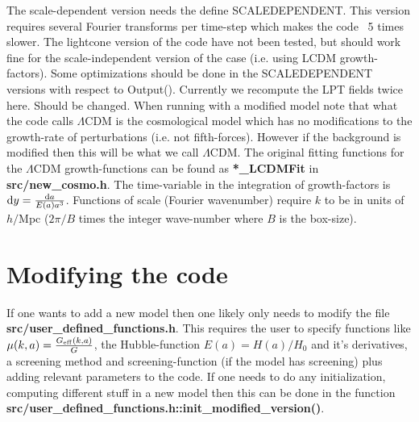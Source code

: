 \documentclass[usenatbib]{article}
\begin{document}
The scale-dependent version needs the define SCALEDEPENDENT. This version requires several Fourier transforms per time-step which makes the code ~5 times slower.
\newline
\newline
The lightcone version of the code have not been tested, but should work fine for the scale-independent version of the case (i.e. using LCDM growth-factors).
\newline
\newline
Some optimizations should be done in the SCALEDEPENDENT versions with respect to Output(). Currently we recompute the LPT fields twice here. Should be changed.
\newline
\newline
When running with a modified model note that what the code calls $\Lambda$CDM is the cosmological model which has no modifications to the growth-rate of perturbations (i.e. not fifth-forces). However if the background is modified then this will be what we call $\Lambda$CDM.
\newline
\newline
The original fitting functions for the $\Lambda$CDM growth-functions can be found as \textbf{*\_LCDMFit} in \textbf{src/new\_cosmo.h}.
\newline
\newline
The time-variable in the integration of growth-factors is ${\rm d}y = \frac{{\rm d}a}{E(a)a^3}$.
\newline
\newline
Functions of scale (Fourier wavenumber) require $k$ to be in units of $h/$Mpc ($2\pi/B$ times the integer wave-number where $B$ is the box-size).

\section*{Modifying the code}

If one wants to add a new model then one likely only needs to modify the file \textbf{src/user\_defined\_functions.h}. This requires the user to specify functions like $\mu(k,a) = \frac{G_{\rm eff}(k,a)}{G}$, the Hubble-function $E(a) = H(a)/H_0$ and it's derivatives, a screening method and screening-function (if the model has screening) plus adding relevant parameters to the code.
\newline
\newline
If one needs to do any initialization, computing different stuff in a new model then this can be done in the function \textbf{src/user\_defined\_functions.h::init\_modified\_version()}.
\end{document}
